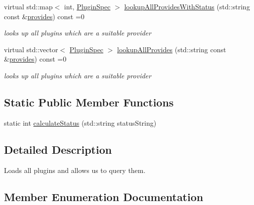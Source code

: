 \begin{DoxyCompactItemize}
virtual std\+::map$<$ int, \hyperlink{classkdb_1_1tools_1_1PluginSpec}{Plugin\+Spec} $>$ \hyperlink{classkdb_1_1tools_1_1PluginDatabase_aa918b547973f627a5604fa3b2b3faf30}{lookup\+All\+Provides\+With\+Status} (std\+::string const \&\hyperlink{classkdb_1_1tools_1_1PluginDatabase_afc91ff760616ee83c6afb70e5a2f0601a73ff10d6a07213c277db4326b3df6c4b}{provides}) const =0
\begin{DoxyCompactList}\small\item\em looks up all plugins which are a suitable provider \end{DoxyCompactList}\item 
virtual std\+::vector$<$ \hyperlink{classkdb_1_1tools_1_1PluginSpec}{Plugin\+Spec} $>$ \hyperlink{classkdb_1_1tools_1_1PluginDatabase_a3ed261ad8562c423b64cf34cbc086161}{lookup\+All\+Provides} (std\+::string const \&\hyperlink{classkdb_1_1tools_1_1PluginDatabase_afc91ff760616ee83c6afb70e5a2f0601a73ff10d6a07213c277db4326b3df6c4b}{provides}) const =0
\begin{DoxyCompactList}\small\item\em looks up all plugins which are a suitable provider \end{DoxyCompactList}\end{DoxyCompactItemize}
\subsection*{Static Public Member Functions}
\begin{DoxyCompactItemize}
\item 
static int \hyperlink{classkdb_1_1tools_1_1PluginDatabase_ab901b98a6c7661bbccffa8ab9ff62dc6}{calculate\+Status} (std\+::string status\+String)
\end{DoxyCompactItemize}


\subsection{Detailed Description}
Loads all plugins and allows us to query them. 

\subsection{Member Enumeration Documentation}
\mbox{\label{classkdb_1_1tools_1_1PluginDatabase_afc91ff760616ee83c6afb70e5a2f0601}} 
